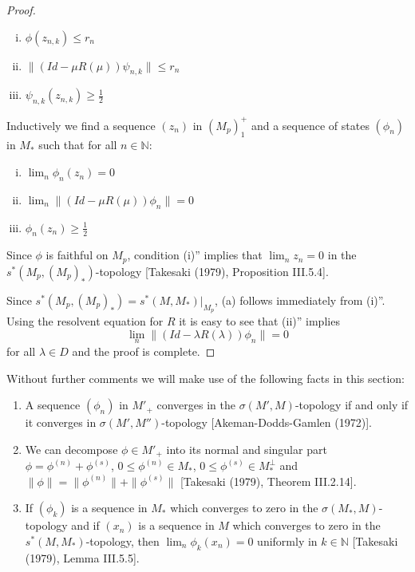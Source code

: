 \begin{proof}
\begin{enumerate}[(i)']
\item
\(\phi(z_{n,k}) \leq r_{n}\)

\item
\(\|(Id - \mu R(\mu))\psi_{n,k}\| \leq r_{n}\)

\item
\(\psi_{n,k}(z_{n,k}) \geq \frac{1}{2}\)
\end{enumerate}

Inductively we find a sequence \((z_{n})\) in \((M_{p})_{1}^{+}\) and a sequence of states \((\phi_{n})\) in \(M_{*}\) such that for all \(n \in \mathbb{N}\):

\begin{enumerate}[(i)'']
\item
\(\lim_{n} \phi_{n}(z_{n}) = 0\)

\item
\(\lim_{n} \|(Id - \mu R(\mu))\phi_{n}\| = 0\)

\item
\(\phi_{n}(z_{n}) \geq \frac{1}{2}\)
\end{enumerate}

Since \(\phi\) is faithful on \(M_{p}\), condition (i)'' implies that \(\lim_{n} z_{n} = 0\) in the \(s^{*}(M_{p},(M_{p})_{*})\)-topology [Takesaki (1979), Proposition III.5.4].

\newpage

Since \(s^{*}(M_{p},(M_{p})_{*}) = s^{*}(M,M_{*})|_{M_{p}}\), (a) follows immediately from (i)''.
Using the resolvent equation for \(R\) it is easy to see that (ii)'' implies
\[
\lim_{n} \|(Id - \lambda R(\lambda))\phi_{n}\| = 0
\]
for all \(\lambda \in D\) and the proof is complete.
\end{proof}

Without further comments we will make use of the following facts in this section:

\begin{enumerate}[(1)]
\item
A sequence \((\phi_{n})\) in \(M'_{+}\) converges in the \(\sigma(M',M)\)-topology if and only if it converges in \(\sigma(M',M'')\)-topology [Akeman-Dodds-Gamlen (1972)].

\item
We can decompose \(\phi \in M'_{+}\) into its normal and singular part \(\phi = \phi^{(n)} + \phi^{(s)}\), \(0 \leq \phi^{(n)} \in M_{*}\), \(0 \leq \phi^{(s)} \in M_*^{\perp}\) and \(\|\phi\| = \|\phi^{(n)}\| + \|\phi^{(s)}\|\) [Takesaki (1979), Theorem III.2.14].

\item
If \((\phi_{k})\) is a sequence in \(M_{*}\) which converges to zero in the \(\sigma(M_{*},M)\)-topology and if \((x_{n})\) is a sequence in \(M\) which converges to zero in the \(s^{*}(M,M_{*})\)-topology, then \(\lim_{n} \phi_{k}(x_{n}) = 0\) uniformly in \(k \in \mathbb{N}\) [Takesaki (1979), Lemma III.5.5].
\end{enumerate}

